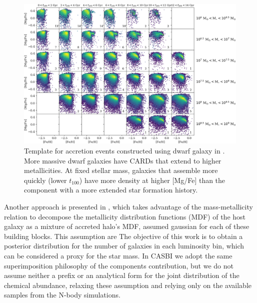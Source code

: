 \begin{figure}[h]
    \centering
    \includegraphics[width=1\textwidth]{./figure/CARDS.jpg}
    \caption{Template for accretion events constructed using dwarf galaxy in \cite{cunninghamReadingCARDsImprint2022}. More massive dwarf galaxies have CARDs that extend to higher metallicities. At fixed stellar mass, galaxies that assemble more quickly (lower $t_{100}$) have more density at higher [Mg/Fe] than the component with a more extended star formation history.}
    \label{fig:CARDS}
\end{figure}

Another approach is presented in \cite{deasonUnravellingMassSpectrum2023}, which takes advantage of the mass-metallicity relation to decompose the metallicity distribution functions (MDF) of the host galaxy as a mixture of accreted halo's MDF, assumed gaussian for each of these building blocks. This assumption are The objective of this work is to obtain a posterior distribution for the number of galaxies in each luminosity bin, which can be considered a proxy for the star mass. In CASBI we adopt the same superimposition philosophy of the components contribution, but we do not assume neither a prefix or an analytical form for the joint distribution of the chemical abundance, relaxing these assumption and relying only on the available samples from the N-body simulations.  